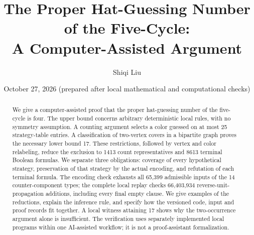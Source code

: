 \documentclass[11pt,reqno]{amsart}
\title[Proper hat guessing on the five-cycle]{The Proper Hat-Guessing Number of the Five-Cycle:\\A Computer-Assisted Argument}
\author{Shiqi Liu}
\date{October 27, 2026 (prepared after local mathematical and computational checks)}
\theoremstyle{definition}
\numberwithin{equation}{section}
\begin{document}
\begin{abstract}
We give a computer-assisted proof that the proper hat-guessing number
of the five-cycle is four. The upper bound concerns arbitrary deterministic
local rules, with no symmetry assumption. A counting argument selects a
color guessed on at most 25 strategy-table entries. A classification of
two-vertex covers in a bipartite graph proves the necessary lower bound
17. These restrictions, followed by vertex and color relabeling,
reduce the exclusion to 1413 count representatives and 8613 terminal
Boolean formulas. We separate three obligations: coverage of every
hypothetical strategy, preservation of that strategy by the actual
encoding, and refutation of each terminal formula. The encoding check
exhausts all 65,399 admissible inputs of the 14 counter-component types;
the complete local replay checks 66,403,934 reverse-unit-propagation
additions, including every final empty clause. We give examples of the
reductions, explain the inference rule, and specify how the versioned
code, input and proof records fit together. A local witness attaining 17
shows why the two-occurrence argument alone is insufficient. The
verification uses separately implemented local programs within one
AI-assisted workflow; it is not a proof-assistant formalization.
\end{abstract}
\maketitle







\appendix




\end{document}
